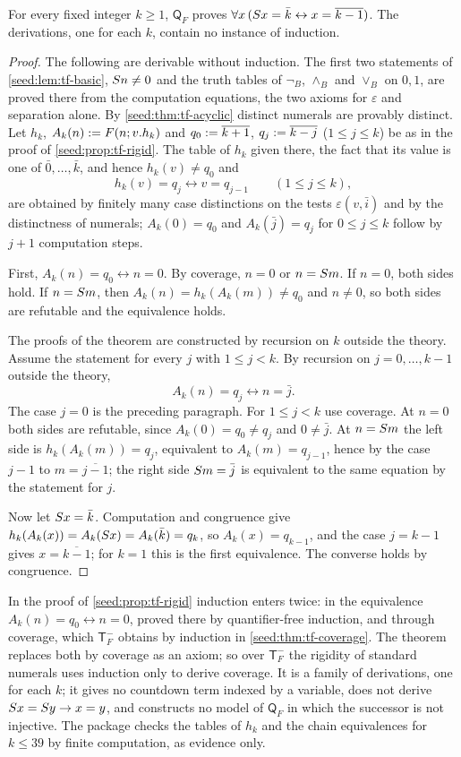 \begin{theorem}\label{cert:thm:qf-rigid}
For every fixed integer $k\geq 1$, $\mathsf Q_F$ proves
$\forall x\,(S x=\bar k\leftrightarrow x=\overline{k-1})$. The derivations,
one for each $k$, contain no instance of induction.
\end{theorem}
\begin{proof}
The following are derivable without induction. The first two statements of
\cref{seed:lem:tf-basic}, $S n\neq 0$ and the truth tables of $\neg_B$,
$\land_B$ and $\lor_B$ on $0,1$, are proved there from the computation
equations, the two axioms for $\varepsilon$ and separation alone. By
\cref{seed:thm:tf-acyclic} distinct numerals are provably distinct. Let $h_k$,
$A_k(n)\mathrel{:=} F(n;v.h_k)$ and $q_0\mathrel{:=}\overline{k+1}$,
$q_j\mathrel{:=}\overline{k-j}$ ($1\le j\le k$) be as in the proof of
\cref{seed:prop:tf-rigid}. The table of $h_k$ given there, the fact that its
value is one of $\bar 0,\dots,\bar k$, and hence $h_k(v)\neq q_0$ and
\[
h_k(v)=q_j\leftrightarrow v=q_{j-1}\qquad(1\le j\le k),
\]
are obtained by finitely many case distinctions on the tests
$\varepsilon(v,\bar i)$ and by the distinctness of numerals; $A_k(0)=q_0$ and
$A_k(\bar j)=q_j$ for $0\le j\le k$ follow by $j+1$ computation steps.

First, $A_k(n)=q_0\leftrightarrow n=0$. By coverage, $n=0$ or $n=S m$. If
$n=0$, both sides hold. If $n=S m$, then $A_k(n)=h_k(A_k(m))\neq q_0$ and
$n\neq 0$, so both sides are refutable and the equivalence holds.

The proofs of the theorem are constructed by recursion on $k$ outside the
theory. Assume the statement for every $j$ with $1\le j<k$. By recursion on
$j=0,\dots,k-1$ outside the theory,
\[
A_k(n)=q_j\leftrightarrow n=\bar j .
\]
The case $j=0$ is the preceding paragraph. For $1\le j<k$ use coverage. At
$n=0$ both sides are refutable, since $A_k(0)=q_0\neq q_j$ and $0\neq\bar j$. At
$n=S m$ the left side is $h_k(A_k(m))=q_j$, equivalent to
$A_k(m)=q_{j-1}$, hence by the case $j-1$ to $m=\overline{j-1}$; the right side
$S m=\bar j$ is equivalent to the same equation by the statement for $j$.

Now let $S x=\bar k$. Computation and congruence give
$h_k(A_k(x))=A_k(S x)=A_k(\bar k)=q_k$, so $A_k(x)=q_{k-1}$, and the case
$j=k-1$ gives $x=\overline{k-1}$; for $k=1$ this is the first equivalence. The
converse holds by congruence.
\end{proof}

In the proof of \cref{seed:prop:tf-rigid} induction enters twice: in the
equivalence $A_k(n)=q_0\leftrightarrow n=0$, proved there by quantifier-free
induction, and through coverage, which $\mathsf T_F^{-}$ obtains by induction
in \cref{seed:thm:tf-coverage}. The theorem replaces both by coverage as an
axiom; so over $\mathsf T_F^{-}$ the rigidity of standard numerals uses
induction only to derive coverage. It is a family of derivations, one for each
$k$; it gives no countdown term indexed by a variable, does not derive
$S x=S y\to x=y$, and constructs no model of $\mathsf Q_F$ in which the
successor is not injective. The package checks the tables of $h_k$ and the
chain equivalences for $k\le 39$ by finite computation, as evidence only.

